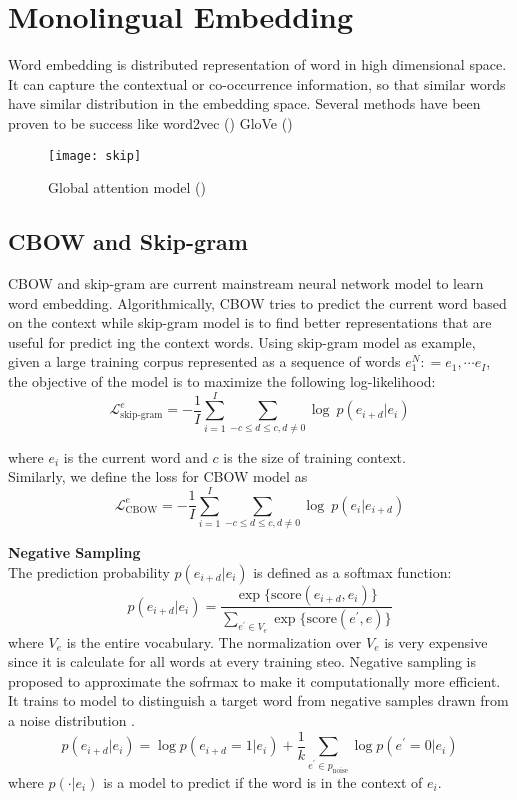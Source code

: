 \section{Monolingual Embedding}
Word embedding is distributed representation of word in high dimensional space. It can capture the contextual or co-occurrence information, so that similar words have similar distribution in the embedding space.  Several methods have been proven to be success like word2vec (\cite{mikolov2013efficient}) GloVe (\cite{pennington2014glove})
\begin{figure}[h]
	\texttt{[image: skip]}
	\caption{Global attention model (\cite{mikolov2013efficient})}
	\centering
\end{figure}
\subsection{CBOW and Skip-gram}
CBOW and skip-gram are current mainstream neural network model to learn word embedding. Algorithmically,  CBOW tries to predict the current word based on the context while skip-gram model is to find better representations that are useful for predict \cite{qi2018and}ing the context words. Using skip-gram model as example, given a large training corpus represented as a sequence of words ${e_1^N: = e_1, \cdots e_I}$, the objective of the model is to maximize the following log-likelihood:
\[ \mathcal{L}^e_{\text{skip-gram}} = - \frac{1}{I} \sum_{i=1}^{I} \sum_{ -c \le d \le c, d\ne 0} \log\ {p(e_{i+d}|e_i)}\]

where $e_i$ is the current word and $c$ is the size of training context. \\


Similarly, we define the loss for CBOW model as
\[ \mathcal{L}^e_{\text{CBOW}} = - \frac{1}{I} \sum_{i=1}^{I} \sum_{ -c \le d \le c, d\ne 0} \log\ {p(e_{i}|e_{i+d})}\]

\textbf{Negative Sampling}\\
The prediction probability $p(e_{i+d}|e_i)$ is defined as a softmax function:
\[p(e_{i+d}|e_i) = \frac{\exp \{ \text{score}(e_{i+d},e_i)\} }{\sum_{e^{\prime} \in V_e}{\exp  \{ \text{score}(e^{\prime}, e) \}}}\]
where $V_e$ is the entire vocabulary. 
The normalization over $V_e$ is very expensive since it is calculate for all words at every training steo. Negative sampling is proposed to approximate the sofrmax to make it computationally more efficient. It trains to model to distinguish a target word from negative samples drawn from a noise distribution .
\[p(e_{i+d}|e_i) = \log p(e_{i+d}=1| e_i) + \frac{1}{k} \sum_{e^{\prime} \in p_{\text{noise}}}\log p(e^{\prime}=0|e_i)\]
where $p(\cdot| e_i)$ is a model to predict if the word is in the context of $e_i$.\\ 

